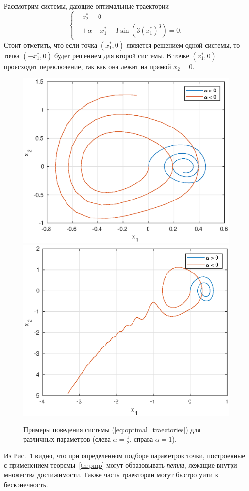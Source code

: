 Рассмотрим системы, дающие оптимальные траектории
\begin{equation}\label{eq:optimal_traectories}
        \left\{
        \begin{aligned}
                & x_2^* = 0 \\
                & \pm \alpha - x_1^* - 3 \sin(3(x_1^*)^3) = 0.
        \end{aligned}
        \right.
\end{equation}
Стоит отметить, что если точка $(x_1^*, 0)$ является решением одной системы, то точка $(-x_1^*, 0)$ будет решением для второй системы. В точке $(x_1^*, 0)$ происходит переключение, так как она лежит на прямой $x_2 = 0$.
\begin{figure}[h]
        \centering
        \includegraphics[width=0.49\linewidth]{research_of_the_system/fixed_points/a0-5t10.eps}
        \includegraphics[width=0.49\linewidth]{research_of_the_system/fixed_points/a1t6.eps}
        \caption{Примеры поведения системы (\ref{eq:optimal_traectories}) для различных параметров (слева $\alpha = \frac{1}{2}$, справа $\alpha = 1$).}
        \label{img:fixed_points}
\end{figure}

Из Рис.~\ref{img:fixed_points} видно, что при определенном подборе параметров точки, построенные с применением теоремы~\ref{th:pmp} могут образовывать \textit{петли}, лежащие внутри множества достижимости. Также часть траекторий могут быстро уйти в бесконечность.